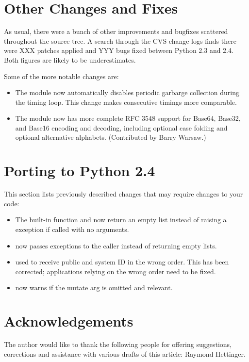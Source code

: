 \documentclass{howto}
\begin{document}
\section{Other Changes and Fixes \label{section-other}}

As usual, there were a bunch of other improvements and bugfixes
scattered throughout the source tree.  A search through the CVS change
logs finds there were XXX patches applied and YYY bugs fixed between
Python 2.3 and 2.4.  Both figures are likely to be underestimates.

Some of the more notable changes are:

\begin{itemize}

\item The  module now automatically disables periodic
  garbarge collection during the timing loop.  This change makes
  consecutive timings more comparable.

\item The  module now has more complete RFC 3548 support
  for Base64, Base32, and Base16 encoding and decoding, including
  optional case folding and optional alternative alphabets.
  (Contributed by Barry Warsaw.)

\end{itemize}


\section{Porting to Python 2.4}

This section lists previously described changes that may require
changes to your code:

\begin{itemize}

\item The  built-in function and 
  now return  an empty list instead of raising a 
  exception if called with no arguments.

\item {} now passes exceptions to the caller
      instead of returning empty lists.

\item {} used to receive public and
  system ID in the wrong order.  This has been corrected; applications
  relying on the wrong order need to be fixed.

\item {} now warns if the mutate arg is omitted
 and relevant.

\end{itemize}


\section{Acknowledgements \label{acks}}

The author would like to thank the following people for offering
suggestions, corrections and assistance with various drafts of this
article: Raymond Hettinger.
\end{document}
